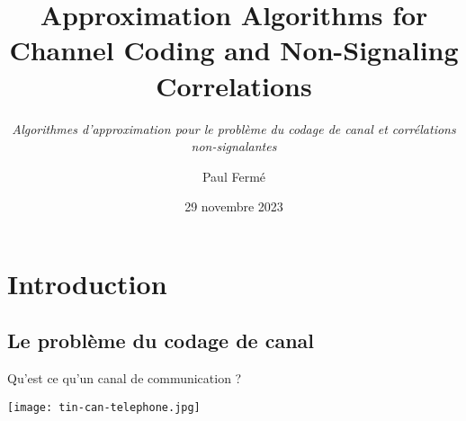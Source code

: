 \documentclass{beamer}
\title{Approximation Algorithms for Channel Coding and Non-Signaling Correlations}
\subtitle{\textit{Algorithmes d'approximation pour le problème du codage de canal et corrélations non-signalantes}}
\author{Paul Fermé}
\institute{ENS de Lyon}
\date{29 novembre 2023}
\theoremstyle{definition}
\theoremstyle{remark}
\begin{document}

\begin{frame}
  \titlepage
\end{frame}


\section{Introduction}
\subsection{Le problème du codage de canal}
\begin{frame}{Qu'est ce qu'un canal de communication ?}
  \pause
  \begin{center}
    \texttt{[image: tin-can-telephone.jpg]}
  \end{center}
\end{frame}
\end{document}
